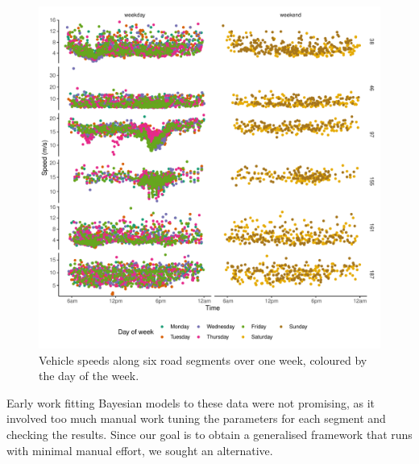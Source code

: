 \begin{knitrout}\small
{}\color{fgcolor}\begin{figure}

{\centering \includegraphics[width=\textwidth]{figure/tt_week0_load-1} 

}

\caption[Vehicle speeds along six road segments over one week]{Vehicle speeds along six road segments over one week, coloured by the day of the week.}\label{fig:tt_week0_load}
\end{figure}


\end{knitrout}

Early work fitting Bayesian models to these data were not promising, as it involved too much manual work tuning the parameters for each segment and checking the results. Since our goal is to obtain a generalised framework that runs with minimal manual effort, we sought an alternative.

